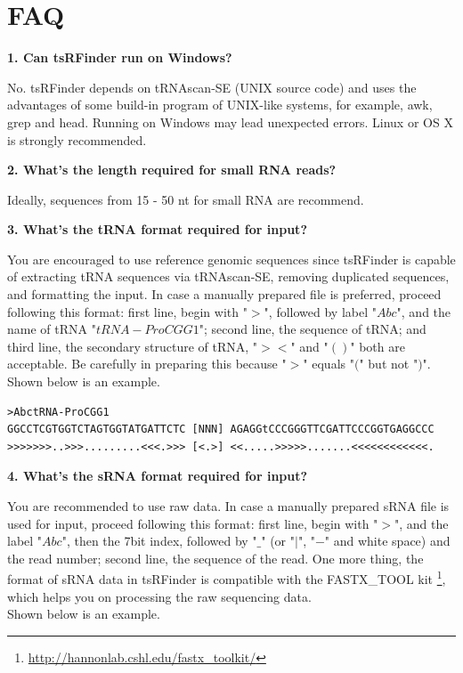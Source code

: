 \documentclass[11pt, a4paper]{article}
\begin{document}
\section{FAQ}

\textbf{1. Can tsRFinder run on Windows?}

No. tsRFinder depends on tRNAscan-SE (UNIX source code) and uses the advantages of some build-in program of UNIX-like systems, for example, awk, grep and head. Running on Windows may lead unexpected errors. Linux or OS X is strongly recommended.

\textbf{2. What's the length required for small RNA reads?}

Ideally, sequences from 15 - 50 nt for small RNA are recommend.

\textbf{3. What's the tRNA format required for input?}

You are encouraged to use reference genomic sequences since tsRFinder is capable of extracting tRNA sequences via tRNAscan-SE, removing duplicated sequences, and formatting the input. In case a manually prepared file is preferred, proceed following this format: first line, begin with "$>$", followed by label "$Abc$", and the name of tRNA "$tRNA-ProCGG1$"; second line, the sequence of tRNA; and third line, the secondary structure of tRNA, "$><$" and "$()$" both are acceptable. Be carefully in preparing this because "$>$" equals "$($" but not "$)$".\\
Shown below is an example.

{\scriptsize \begin{tcolorbox}[colback=blue!5!white,colframe=pink!75!black,title=tRNA example]
\begin{verbatim}
>AbctRNA-ProCGG1
GGCCTCGTGGTCTAGTGGTATGATTCTC [NNN] AGAGGtCCCGGGTTCGATTCCCGGTGAGGCCC
>>>>>>>..>>>.........<<<.>>> [<.>] <<.....>>>>>.......<<<<<<<<<<<<.
\end{verbatim}
\end{tcolorbox}}

\textbf{4. What's the sRNA format required for input?}

You are recommended to use raw data. In case a manually prepared sRNA file is used for input, proceed following this format: first line, begin with "$>$", and the label "$Abc$", then the 7\-bit index, followed by "$\_$" (or "$|$", "$-$" and white space) and the read number; second line, the sequence of the read. One more thing, the format of sRNA data in tsRFinder is compatible with the FASTX\_TOOL kit \footnote{\url{http://hannonlab.cshl.edu/fastx_toolkit/}}, which helps you on processing the raw sequencing data.\\
Shown below is an example.
\end{document}

